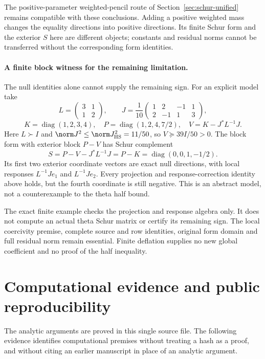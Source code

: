 \documentclass[11pt,a4paper]{article}
\numberwithin{equation}{section}
\theoremstyle{definition}\newtheorem{definition}[theorem]{Definition}
\theoremstyle{remark}\newtheorem{remark}[theorem]{Remark}
\begin{document}
The positive-parameter weighted-pencil route of Section~\ref{sec:schur-unified} remains compatible with these conclusions. Adding a positive weighted mass changes the equality directions into positive directions. Its finite Schur form and the exterior $S$ here are different objects; constants and residual norms cannot be transferred without the corresponding form identities.

\paragraph{A finite block witness for the remaining limitation.}
The null identities alone cannot supply the remaining sign. For an explicit model take
\[
 L=\begin{pmatrix}3&1\\1&2\end{pmatrix},\qquad
 J=\frac1{10}\begin{pmatrix}1&2&-1&1\\2&-1&1&3\end{pmatrix},
\]
\[
 K=\operatorname{diag}(1,2,3,4),\quad
 P=\operatorname{diag}(1,2,4,7/2),\quad
 V=K-J^*L^{-1}J.
\]
Here $L\succ I$ and $\norm J^2\le\norm J_{\rm HS}^2=11/50$, so $V\succeq39I/50>0$.
The block form with exterior block $P-V$ has Schur complement
\[
 S=P-V-J^*L^{-1}J=P-K=\operatorname{diag}(0,0,1,-1/2).
\]
Its first two exterior coordinate vectors are exact null directions, with local responses $L^{-1}Je_1$ and $L^{-1}Je_2$. Every projection and response-correction identity above holds, but the fourth coordinate is still negative. This is an abstract model, not a counterexample to the theta half bound.


The exact finite example checks the projection and response algebra only. It does not compute an actual theta Schur matrix or certify its remaining sign. The local coercivity premise, complete source and row identities, original form domain and full residual norm remain essential. Finite deflation supplies no new global coefficient and no proof of the half inequality.


\section{Computational evidence and public reproducibility}\label{app:provenance-unified}
The analytic arguments are proved in this single source file. The following evidence identifies computational premises without treating a hash as a proof, and without citing an earlier manuscript in place of an analytic argument.
\end{document}
